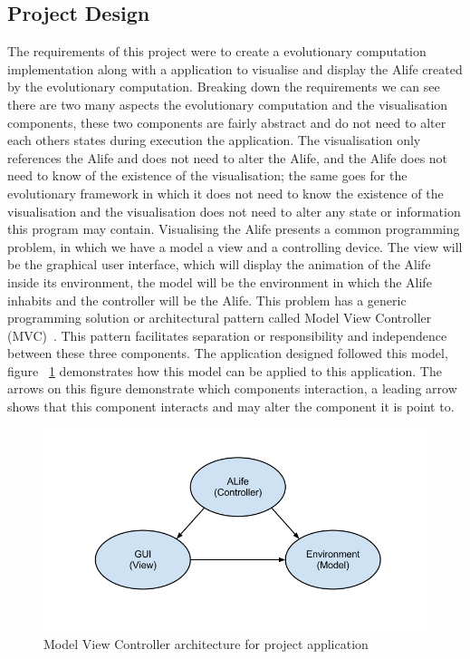 \documentclass[12pt]{article}
\begin{document}
\subsection{Project Design}
The requirements of this project were to create a evolutionary computation implementation along with a application to visualise and
display the Alife created by the evolutionary computation. Breaking down the requirements we can see there are two many aspects
the evolutionary computation and the visualisation components, these two components are fairly abstract and do not need to alter
each others states during execution the application. The visualisation only references the Alife and does not need to alter
the Alife, and the Alife does not need to know of the existence of the visualisation; the same goes for the evolutionary framework
in which it does not need to know the existence of the visualisation and the visualisation does not need to alter any state or
information this program may contain. Visualising the Alife presents a common programming problem, in which we have a model a view and a controlling
device. The view will be the graphical user interface, which will display the animation of the Alife inside its environment, the 
model will be the environment in which the Alife inhabits and the controller will be the Alife. This problem has a generic programming
solution or architectural pattern called Model View Controller (MVC)~\cite{fowler03}. This pattern facilitates separation or responsibility
and independence between these three components. The application designed followed this model, figure ~\ref{fig:mvc} demonstrates 
how this model can be applied to this application. The arrows on this figure demonstrate which components interaction, a leading arrow
shows that this component interacts and may alter the component it is point to.

\begin{figure} [ht]
\centering
\includegraphics[scale = 0.5]{mvc.png}
\caption{Model View Controller architecture for project application}
\label{fig:mvc}
\end{figure}
\end{document}
